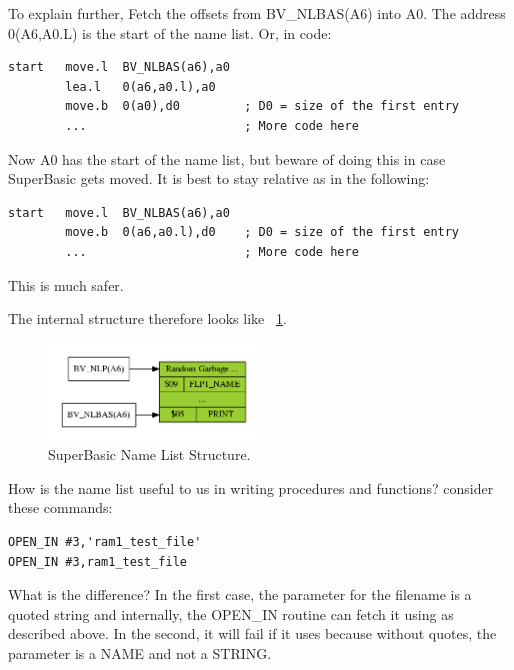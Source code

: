 To explain further, Fetch the offsets from BV\_NLBAS(A6) into A0. The
    address 0(A6,A0.L) is the start of the name list. Or, in code:

\begin{lstlisting}[firstnumber=1,]
start   move.l  BV_NLBAS(a6),a0
        lea.l   0(a6,a0.l),a0
        move.b  0(a0),d0         ; D0 = size of the first entry
        ...                      ; More code here
\end{lstlisting}

Now A0 has the start of the name list, but beware of doing this in
    case SuperBasic gets moved. It is best to stay relative as in the
    following:

\begin{lstlisting}[firstnumber=1,]
start   move.l  BV_NLBAS(a6),a0
        move.b  0(a6,a0.l),d0    ; D0 = size of the first entry
        ...                      ; More code here
\end{lstlisting}

This is much safer.

The internal structure therefore looks like \figurename~\ref{fig:SuperBasicNameListStructure}.

\begin{figure}[h]
\center
\includegraphics[width=0.5\textwidth]{Content/images/Name_List.png}
\caption{SuperBasic Name List Structure.}
\label{fig:SuperBasicNameListStructure}
\end{figure}

How is the name list useful to us in writing procedures and
    functions? consider these commands:

\begin{lstlisting}[firstnumber=1,]
OPEN_IN #3,'ram1_test_file'
OPEN_IN #3,ram1_test_file
\end{lstlisting}

What is the difference? In the first case, the parameter for the
    filename is a quoted string and internally, the OPEN\_IN routine can fetch
    it using  as described above. In the second, it will fail if it
    uses  because without quotes, the parameter is a NAME and not a
    STRING.

